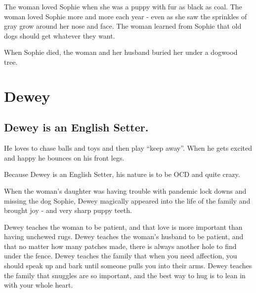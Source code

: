 \documentclass[
  openany]{book}
\begin{document}
The woman loved Sophie when she was a puppy with fur as black as coal.
The woman loved Sophie more and more each year - even as she saw the sprinkles of gray grow around her nose and face.
The woman learned from Sophie that old dogs should get whatever they want.

When Sophie died, the woman and her husband buried her under a dogwood tree.

\hypertarget{dewey}{%
\chapter{Dewey}\label{dewey}}

\hypertarget{dewey-is-an-english-setter.}{%
\section{Dewey is an English Setter.}\label{dewey-is-an-english-setter.}}

He loves to chase balls and toys and then play ``keep away''.
When he gets excited and happy he bounces on his front legs.

Because Dewey is an English Setter, his nature is to be OCD and quite crazy.

When the woman's daughter was having trouble with pandemic lock downs and missing the dog Sophie,
Dewey magically appeared into the life of the family and brought joy - and very sharp puppy teeth.

Dewey teaches the woman to be patient, and that love is more important than having unchewed rugs.
Dewey teaches the woman's husband to be patient, and that no matter how many patches made, there is always another hole to find under the fence.
Dewey teaches the family that when you need affection, you should speak up and bark until someone pulls you into their arms.
Dewey teaches the family that snuggles are so important, and the best way to hug is to lean in with your whole heart.
\end{document}
